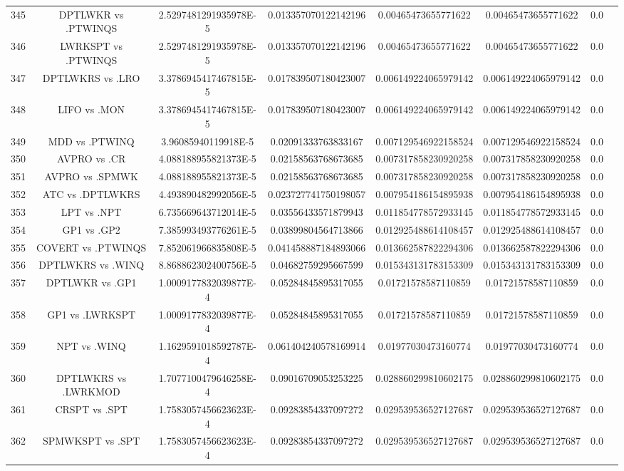 \documentclass[a3paper,10pt]{article}
\begin{document}
\begin{table}[!htp]
\begin{tabular}{cccccccc}
345&DPTLWKR vs .PTWINQS&2.5297481291935978E-5&0.013357070122142196&0.00465473655771622&0.00465473655771622&0.0\\
346&LWRKSPT vs .PTWINQS&2.5297481291935978E-5&0.013357070122142196&0.00465473655771622&0.00465473655771622&0.0\\
347&DPTLWKRS vs .LRO&3.3786945417467815E-5&0.017839507180423007&0.006149224065979142&0.006149224065979142&0.0\\
348&LIFO vs .MON&3.3786945417467815E-5&0.017839507180423007&0.006149224065979142&0.006149224065979142&0.0\\
349&MDD vs .PTWINQ&3.96085940119918E-5&0.02091333763833167&0.007129546922158524&0.007129546922158524&0.0\\
350&AVPRO vs .CR&4.088188955821373E-5&0.02158563768673685&0.007317858230920258&0.007317858230920258&0.0\\
351&AVPRO vs .SPMWK&4.088188955821373E-5&0.02158563768673685&0.007317858230920258&0.007317858230920258&0.0\\
352&ATC vs .DPTLWKRS&4.493890482992056E-5&0.023727741750198057&0.007954186154895938&0.007954186154895938&0.0\\
353&LPT vs .NPT&6.735669643712014E-5&0.03556433571879943&0.011854778572933145&0.011854778572933145&0.0\\
354&GP1 vs .GP2&7.385993493776261E-5&0.03899804564713866&0.012925488614108457&0.012925488614108457&0.0\\
355&COVERT vs .PTWINQS&7.852061966835808E-5&0.041458887184893066&0.013662587822294306&0.013662587822294306&0.0\\
356&DPTLWKRS vs .WINQ&8.868862302400756E-5&0.04682759295667599&0.015343131783153309&0.015343131783153309&0.0\\
357&DPTLWKR vs .GP1&1.0009177832039877E-4&0.05284845895317055&0.01721578587110859&0.01721578587110859&0.0\\
358&GP1 vs .LWRKSPT&1.0009177832039877E-4&0.05284845895317055&0.01721578587110859&0.01721578587110859&0.0\\
359&NPT vs .WINQ&1.1629591018592787E-4&0.061404240578169914&0.01977030473160774&0.01977030473160774&0.0\\
360&DPTLWKRS vs .LWRKMOD&1.7077100479646258E-4&0.09016709053253225&0.028860299810602175&0.028860299810602175&0.0\\
361&CRSPT vs .SPT&1.7583057456623623E-4&0.09283854337097272&0.029539536527127687&0.029539536527127687&0.0\\
362&SPMWKSPT vs .SPT&1.7583057456623623E-4&0.09283854337097272&0.029539536527127687&0.029539536527127687&0.0\\

\end{tabular}
\end{table}
\end{document}
